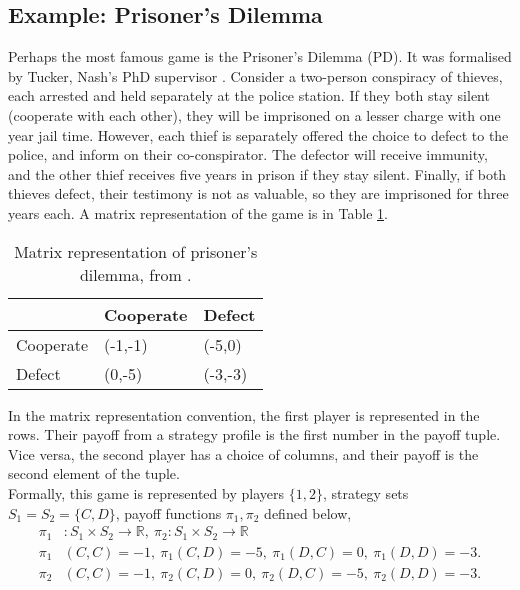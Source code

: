\subsection{Example: Prisoner's Dilemma} \label{PD}
Perhaps the most famous game is the Prisoner's Dilemma (PD). It was formalised by Tucker, Nash's PhD supervisor \cite{RN82}. Consider a two-person conspiracy of thieves, each arrested and held separately at the police station. If they both stay silent (cooperate with each other), they will be imprisoned on a lesser charge with one year jail time. However, each thief is separately offered the choice to defect to the police, and inform on their co-conspirator. The defector will receive immunity, and the other thief receives five years in prison if they stay silent. Finally, if both thieves defect, their testimony is not as valuable, so they are imprisoned for three years each. A matrix representation of the game is in Table \ref{table:PD}. 

\begin{center}
\begin{table}[h]
\centering
\begin{tabular}{|l|l|l|}
\hline
          & Cooperate & Defect \\ \hline
Cooperate & (-1,-1)     & (-5,0)  \\ \hline
Defect    & (0,-5)     & (-3,-3)  \\ \hline
\end{tabular}
\caption{Matrix representation of prisoner's dilemma, from \cite{RN79}.}
\label{table:PD}
\end{table}
\end{center} 
In the matrix representation convention, the first player is represented in the rows. Their payoff from a strategy profile is the first number in the payoff tuple. Vice versa, the second player has a choice of columns, and their payoff is the second element of the tuple. \\

Formally, this game is represented by players $\{1,2\}$, strategy sets $S_1 = S_2 = \{C,D\}$, payoff functions $\pi_1, \pi_2$ defined below, 
\begin{align*}
    \pi_1& : S_1 \times S_2 \to \mathbb R, ~ \pi_2: S_1 \times S_2 \to \mathbb R\\
    \pi_1&(C,C) = -1,~ \pi_1(C,D) = -5,~ \pi_1(D,C) = 0,~ \pi_1(D,D) = -3.\\
    \pi_2&(C,C) = -1,~ \pi_2(C,D) = 0,~ \pi_2(D,C) = -5,~ \pi_2(D,D) = -3.
\end{align*}

